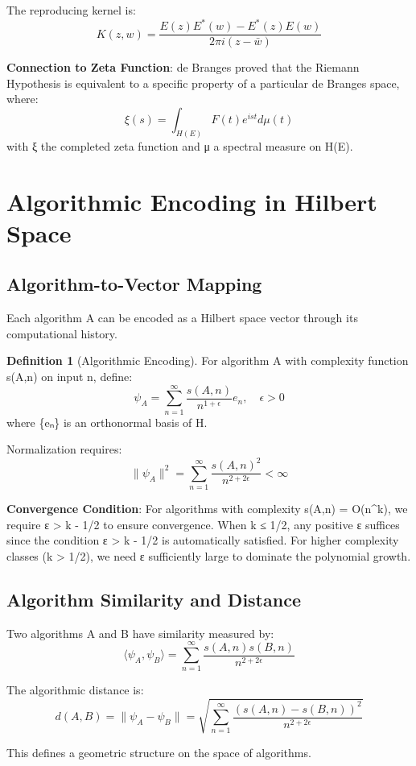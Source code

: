 \documentclass[12pt]{article}
\theoremstyle{plain}
\theoremstyle{definition}
\newtheorem{definition}[theorem]{Definition}
\begin{document}
The reproducing kernel is:
$$K(z, w) = \frac{E(z)E^*(w) - E^*(z)E(w)}{2\pi i(z - \bar{w})}$$

\textbf{Connection to Zeta Function}: de Branges proved that the Riemann Hypothesis is equivalent to a specific property of a particular de Branges space, where:
$$\xi(s) = \int_{H(E)} F(t) e^{ist} d\mu(t)$$
with ξ the completed zeta function and μ a spectral measure on H(E).

\section{Algorithmic Encoding in Hilbert Space}

\subsection{Algorithm-to-Vector Mapping}

Each algorithm A can be encoded as a Hilbert space vector through its computational history.

\begin{definition}[Algorithmic Encoding]
For algorithm A with complexity function s(A,n) on input n, define:
$$\psi_A = \sum_{n=1}^{\infty} \frac{s(A,n)}{n^{1 + \epsilon}} e_n, \quad \epsilon > 0$$
where \{eₙ\} is an orthonormal basis of H.

Normalization requires:
$$\|\psi_A\|^2 = \sum_{n=1}^{\infty} \frac{s(A,n)^2}{n^{2 + 2\epsilon}} < \infty$$
\end{definition}

\textbf{Convergence Condition}: For algorithms with complexity s(A,n) = O(n^k), we require ε > k - 1/2 to ensure convergence. When k ≤ 1/2, any positive ε suffices since the condition ε > k - 1/2 is automatically satisfied. For higher complexity classes (k > 1/2), we need ε sufficiently large to dominate the polynomial growth.

\subsection{Algorithm Similarity and Distance}

Two algorithms A and B have similarity measured by:
$$\langle \psi_A, \psi_B \rangle = \sum_{n=1}^{\infty} \frac{s(A,n) s(B,n)}{n^{2+2\epsilon}}$$

The algorithmic distance is:
$$d(A, B) = \|\psi_A - \psi_B\| = \sqrt{\sum_{n=1}^{\infty} \frac{(s(A,n) - s(B,n))^2}{n^{2+2\epsilon}}}$$

This defines a geometric structure on the space of algorithms.
\end{document}
